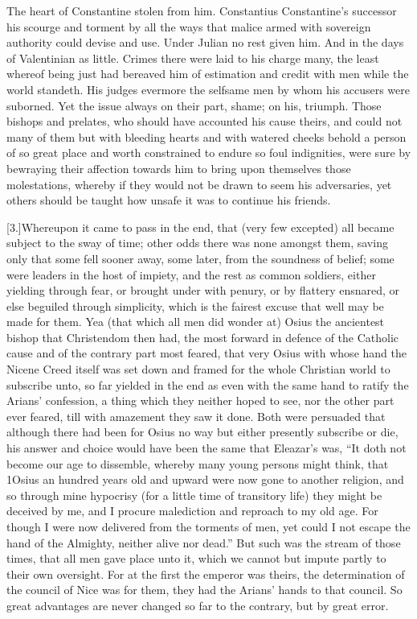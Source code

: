  The heart of Constantine stolen from him. Constantius Constantine’s successor his scourge and torment by all the ways that malice armed with sovereign authority could devise and use. Under Julian no rest given him. And in the days of Valentinian as little. Crimes there were laid to his charge many, the least whereof being just had bereaved him of estimation and credit with men while the world standeth. His judges evermore the selfsame men by whom his accusers were suborned. Yet the issue always on their part, shame; on his, triumph. Those bishops and prelates, who should have accounted his cause theirs, and could not many of them but with bleeding hearts and with watered cheeks behold a person of so great place and worth constrained to endure so foul indignities, were sure by bewraying their affection towards him to bring upon themselves those molestations, whereby if they would not be drawn to seem his adversaries, yet others should be taught how unsafe it was to continue his friends.

[3.]Whereupon it came to pass in the end, that (very few excepted) all became subject to the sway of time; other odds there was none amongst them, saving only that some fell sooner away, some later, from the soundness of belief; some were leaders in the host of impiety, and the rest as common soldiers, either yielding through fear, or brought under with penury, or by flattery ensnared, or else beguiled through simplicity, which is the fairest excuse that well may be made for them. Yea (that which all men did wonder at) Osius the ancientest bishop that Christendom then had, the most forward in defence of the Catholic cause and of the contrary part most feared, that very Osius with whose hand the Nicene Creed itself was set down and framed for the whole Christian world to subscribe unto, so far yielded in the end as even with the same hand to ratify the Arians’ confession, a thing which they neither hoped to see, nor the other part ever feared, till with amazement they saw it done. Both were persuaded that although there had been for Osius no way but either presently subscribe or die, his answer and choice would have been the same that Eleazar’s was, “It doth not become our age to dissemble, whereby many young persons might think,  that 1Osius an hundred years old and upward were now gone to another religion,
 and so through mine hypocrisy (for a little time of transitory life) they might be deceived by me, and I procure malediction and reproach to my old age. For though I were now delivered from the torments of men, yet could I not escape the hand of the Almighty, neither alive nor dead.” But such was the stream of those times, that all men gave place unto it, which we cannot but impute partly to their own oversight. For at the first the emperor was theirs, the determination of the council of Nice was for them, they had the Arians’ hands to that council. So great advantages are never changed so far to the contrary, but by great error.

